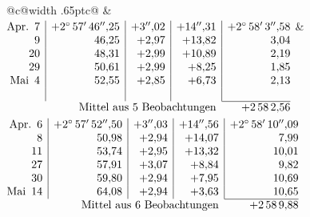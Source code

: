 \noindent\begin{tabular}{@{}c@{\hspace{.4em}\vrule width .65pt\hspace{.4em}}c@{}}
 &
 \\[.18ex]
\(\begin{array}[t]{@{}r|r|r|r|r@{}}
\text{Apr.}\enspace 7 & +2^\circ\,57'\,46''{,}25 & +3''{,}02 & +14''{,}31 & +2^\circ\,58'\,3''{,}58\\
9 & 46{,}25 & +2{,}97 & +13{,}82 & 3{,}04\\
20 & 48{,}31 & +2{,}99 & +10{,}89 & 2{,}19\\
29 & 50{,}61 & +2{,}99 & +8{,}25 & 1{,}85\\
\text{Mai}\enspace 4 & 52{,}55 & +2{,}85 & +6{,}73 & 2{,}13\\
 & & & & \\
\cline{5-5}
\multicolumn{4}{r}{\text{Mittel aus 5 Beobachtungen}} & +2\,58\,2{,}56
\end{array}\)
&
\(\begin{array}[t]{@{}r|r|r|r|r@{}}
\text{Apr.}\enspace 6 & +2^\circ\,57'\,52''{,}50 & +3''{,}03 & +14''{,}56 & +2^\circ\,58'\,10''{,}09\\
8 & 50{,}98 & +2{,}94 & +14{,}07 & 7{,}99\\
11 & 53{,}74 & +2{,}95 & +13{,}32 & 10{,}01\\
27 & 57{,}91 & +3{,}07 & +8{,}84 & 9{,}82\\
30 & 59{,}80 & +2{,}94 & +7{,}95 & 10{,}69\\
\text{Mai}\enspace 14 & 64{,}08 & +2{,}94 & +3{,}63 & 10{,}65\\
\cline{5-5}
\multicolumn{4}{r}{\text{Mittel aus 6 Beobachtungen}} & +2\,58\,9{,}88
\end{array}\)
\end{tabular}\par\medskip
